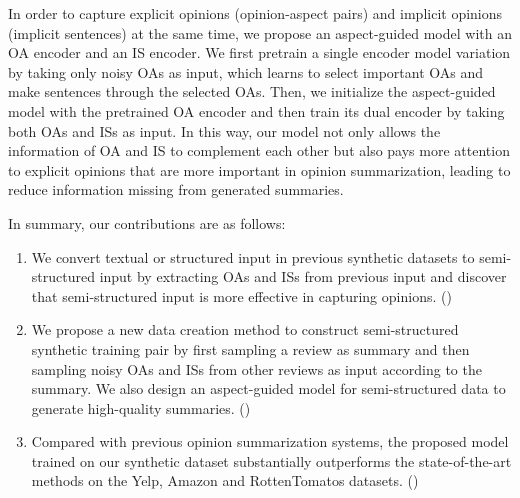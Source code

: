 In order to capture explicit opinions (opinion-aspect pairs) 
and implicit opinions (implicit sentences) at the same time,
we propose an aspect-guided model with an OA encoder and
an IS encoder. 
We first pretrain a single encoder model variation by taking only noisy OAs as input, 
which learns to select important OAs and make sentences through the selected OAs. 
Then, we initialize the aspect-guided model with the pretrained OA encoder and 
then train its dual encoder by taking both OAs and ISs as input.
In this way, our model not only allows the information of OA and IS to complement each other but also pays more attention to explicit opinions that are more important in opinion summarization,
leading to reduce information missing from generated summaries.

In summary, our contributions are as follows:
\begin{enumerate}
\item We convert textual or structured input in previous synthetic datasets to semi-structured input by extracting OAs and ISs from previous input and discover that semi-structured input is more effective in capturing opinions.
()

\item 
We propose a new data creation method to construct semi-structured synthetic training pair by first sampling a review as summary and then sampling noisy OAs and ISs from other reviews as input according to the summary.
We also design an aspect-guided model for semi-structured data to generate high-quality summaries.
()

\item 
Compared with previous opinion summarization systems, 
the proposed model trained on our synthetic dataset substantially outperforms the 
state-of-the-art methods on the Yelp, Amazon and RottenTomatos datasets. ()
\end{enumerate}
